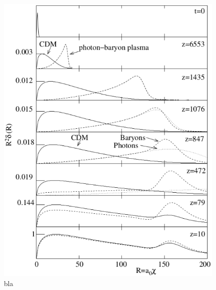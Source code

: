 \documentclass[11pt, twoside, a4paper, openright]{report}
\begin{document}
\begin{figure}
  \centering
  \includegraphics[scale=0.5]{bao_schema}
  \caption{bla}
  \label{fig:bao_schema}
\end{figure}
\end{document}
